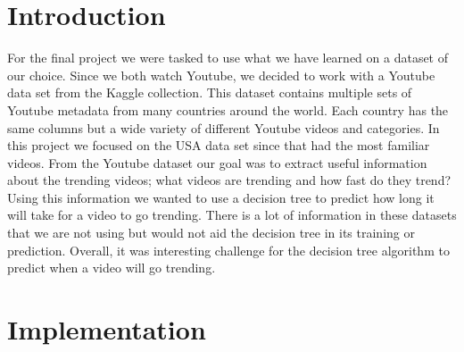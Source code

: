 \documentclass{article}
\begin{document}
\section*{Introduction}
For the final project we were tasked to use what we have learned on a dataset of our choice. 
Since we both watch Youtube, we decided to work with a Youtube data set from the Kaggle collection. 
This dataset contains multiple sets of Youtube metadata from many countries around the world. 
Each country has the same columns but a wide variety of different Youtube videos and categories. 
In this project we focused on the USA data set since that had the most familiar videos. 
From the Youtube dataset our goal was to extract useful information about the trending videos; what videos are trending and how fast do they trend?
Using this information we wanted to use a decision tree to predict how long it will take for a video to go trending. 
There is a lot of information in these datasets that we are not using but would not aid the decision tree in its training or prediction.
Overall, it was interesting challenge for the decision tree algorithm to predict when a video will go trending.
\section*{Implementation}
\end{document}
